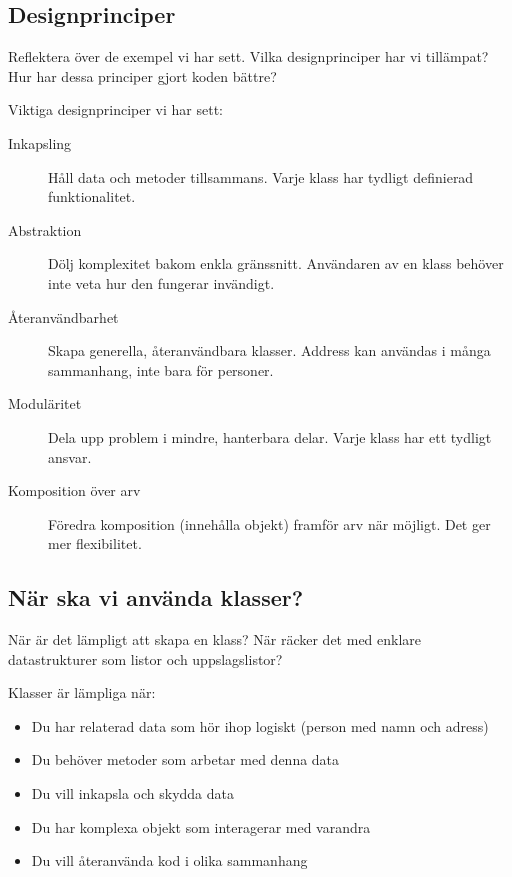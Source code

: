 \subsection{Designprinciper}

\begin{exercise}
  Reflektera över de exempel vi har sett. Vilka designprinciper har vi 
  tillämpat? Hur har dessa principer gjort koden bättre?
\end{exercise}

Viktiga designprinciper vi har sett:

\begin{description}
  \item[Inkapsling] Håll data och metoder tillsammans. Varje klass har 
    tydligt definierad funktionalitet.
  \item[Abstraktion] Dölj komplexitet bakom enkla gränssnitt. Användaren av 
    en klass behöver inte veta hur den fungerar invändigt.
  \item[Återanvändbarhet] Skapa generella, återanvändbara klasser. Address 
    kan användas i många sammanhang, inte bara för personer.
  \item[Moduläritet] Dela upp problem i mindre, hanterbara delar. Varje klass 
    har ett tydligt ansvar.
  \item[Komposition över arv] Föredra komposition (innehålla objekt) framför 
    arv när möjligt. Det ger mer flexibilitet.
\end{description}

\subsection{När ska vi använda klasser?}

\begin{exercise}
  När är det lämpligt att skapa en klass? När räcker det med enklare 
  datastrukturer som listor och uppslagslistor?
\end{exercise}

Klasser är lämpliga när:
\begin{itemize}
  \item Du har relaterad data som hör ihop logiskt (person med namn och adress)
  \item Du behöver metoder som arbetar med denna data
  \item Du vill inkapsla och skydda data
  \item Du har komplexa objekt som interagerar med varandra
  \item Du vill återanvända kod i olika sammanhang
\end{itemize}

